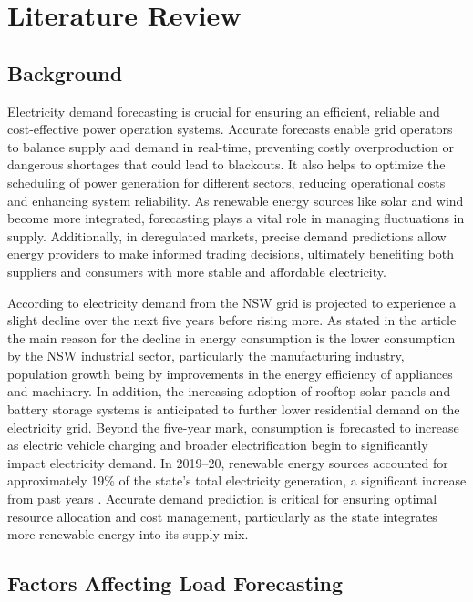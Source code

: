 \documentclass[mstat,12pt]{unswthesis}
\begin{document}
\chapter{Literature Review}\label{literature-review}

\section{Background}\label{background}

Electricity demand forecasting is crucial for ensuring an efficient,
reliable and cost-effective power operation systems. Accurate forecasts
enable grid operators to balance supply and demand in real-time,
preventing costly overproduction or dangerous shortages that could lead
to blackouts. It also helps to optimize the scheduling of power
generation for different sectors, reducing operational costs and
enhancing system reliability. As renewable energy sources like solar and
wind become more integrated, forecasting plays a vital role in managing
fluctuations in supply. Additionally, in deregulated markets, precise
demand predictions allow energy providers to make informed trading
decisions, ultimately benefiting both suppliers and consumers with more
stable and affordable electricity.

According to \cite{nsw_epa_2021_energy_consumption} electricity demand
from the NSW grid is projected to experience a slight decline over the
next five years before rising more. As stated in the article the main
reason for the decline in energy consumption is the lower consumption by
the NSW industrial sector, particularly the manufacturing industry,
population growth being by improvements in the energy efficiency of
appliances and machinery. In addition, the increasing adoption of
rooftop solar panels and battery storage systems is anticipated to
further lower residential demand on the electricity grid. Beyond the
five-year mark, consumption is forecasted to increase as electric
vehicle charging and broader electrification begin to significantly
impact electricity demand. In 2019--20, renewable energy sources
accounted for approximately 19\% of the state's total electricity
generation, a significant increase from past years
\cite{nsw_epa_2021_energy_consumption}. Accurate demand prediction is
critical for ensuring optimal resource allocation and cost management,
particularly as the state integrates more renewable energy into its
supply mix.

\section{Factors Affecting Load
Forecasting}\label{factors-affecting-load-forecasting}
\end{document}
